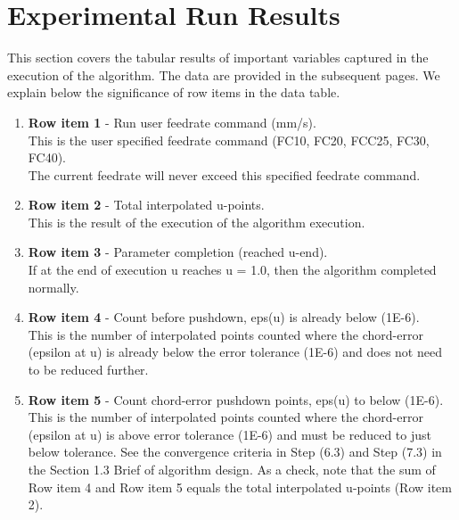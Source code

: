 
\section{Experimental Run Results}

This section covers the tabular results of important variables captured in the execution of the algorithm. The data are provided in the subsequent pages. We explain below the significance of row items in the data table.

\begin{enumerate}
	\item \textbf{Row item 1} - Run user feedrate command (mm/s).\\
	This is the user specified feedrate command (FC10, FC20, FCC25, FC30, FC40).\\
	The current feedrate will never exceed this specified feedrate command.\\
	
	\item \textbf{Row item 2} - Total interpolated u-points.\\
	This is the result of the execution of the algorithm execution.\\
	
	\item \textbf{Row item 3} - Parameter completion (reached u-end).\\
	If at the end of execution u reaches u = 1.0, then the algorithm completed normally.\\ 
	
	\item \textbf{Row item 4} - Count before pushdown, eps(u) is already below (1E-6).\\
	This is the number of interpolated points counted where the chord-error (epsilon at u) is already below the error tolerance (1E-6) and does not need to be reduced further.\\
		
	\item \textbf{Row item 5} - Count chord-error pushdown points, eps(u) to below (1E-6).\\
	This is the number of interpolated points counted where the chord-error (epsilon at u) is above error tolerance (1E-6) and must be reduced to just below tolerance. See the convergence criteria in Step (6.3) and Step (7.3) in the Section 1.3 Brief of algorithm design.
	As a check, note that the sum of Row item 4 and Row item 5 equals the total interpolated u-points (Row item 2).\\
	

\end{enumerate}

